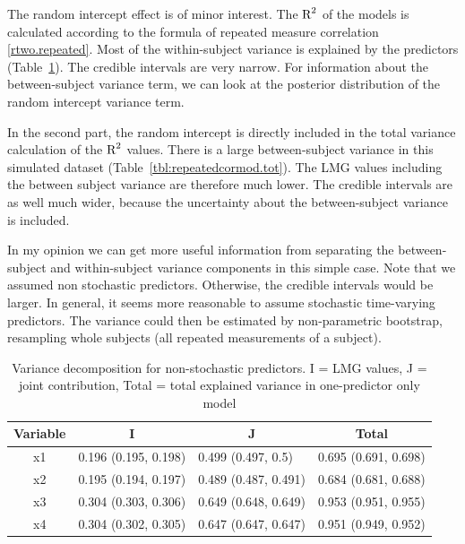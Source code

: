 \documentclass[11pt,a4paper,twoside]{book}
\begin{document}
The random intercept effect is of minor interest. The $\text{R}^2$ of the models is calculated according to the formula of repeated measure correlation \eqref{rtwo.repeated}.  Most of the within-subject variance is explained by the predictors (Table~\ref{tbl:repeatedcormod}). The credible intervals are very narrow. For information about the between-subject variance term, we can look at the posterior distribution of the random intercept variance term.

In the second part, the random intercept is directly included in the total variance calculation of the $\text{R}^2$ values. There is a large between-subject variance in this simulated dataset (Table~\ref{tbl:repeatedcormod.tot}). The LMG values including the between subject variance are  therefore much lower. The credible intervals are as well much wider, because the uncertainty about the between-subject variance is included. 

In my opinion we can get more useful information from separating the between-subject and within-subject variance components in this simple case. Note that we assumed non stochastic predictors. Otherwise, the credible intervals would be larger. In general, it seems more reasonable to assume stochastic time-varying predictors. The variance could then be estimated by non-parametric bootstrap, resampling whole subjects (all repeated measurements of a subject).







\begin{table}[h]
\caption{Variance decomposition for non-stochastic predictors. I = LMG values, J = joint contribution, Total = total explained variance in one-predictor only model}
\centering
\begin{tabular}{clll}
  \toprule
  \multicolumn{1}{c}{\textbf{Variable}} & \multicolumn{1}{c}{\textbf{I}} &\multicolumn{1}{c}{\textbf{J}} & \multicolumn{1}{c}{\textbf{Total}} \\
  \hline
x1 & 0.196 (0.195, 0.198)  & 0.499 (0.497, 0.5)   & 0.695 (0.691, 0.698)  \\ 
x2 & 0.195 (0.194, 0.197)  & 0.489 (0.487, 0.491)   & 0.684 (0.681, 0.688)  \\ 
x3 & 0.304 (0.303, 0.306)  & 0.649 (0.648, 0.649)   & 0.953 (0.951, 0.955)  \\ 
x4 & 0.304 (0.302, 0.305)  & 0.647 (0.647, 0.647)   & 0.951 (0.949, 0.952)  \\ 
   \bottomrule
\end{tabular}
\label{tbl:repeatedcormod}
\end{table}
\end{document}
